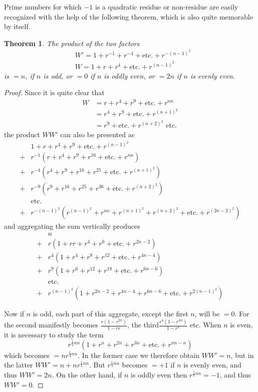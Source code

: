 \documentclass{book}
\theoremstyle{plain}
\newtheorem*{theorem}{Theorem}
\theoremstyle{remark}
\begin{document}
Prime numbers for which $-1$ is a quadratic residue or non-residue are easily recognized with the help of the following theorem, which is also quite memorable by itself.  
\begin{theorem} The product of the two factors
\begin{align*}
& W' = 1 + r^{-1} + r^{-4} + \textrm{etc.}+r^{-(n-1)^2} \\
& W = 1 + r + r^4 + \textrm{etc.} + r^{(n-1)^2} 
\end{align*}
is $=n$, if $n$ is odd, or $=0$ if $n$ is oddly even, or $=2n$ if $n$ is evenly even.
\end{theorem}
\begin{proof} Since it is quite clear that
\begin{align*}
W &= r + r^4 + r^9 + \textrm{etc.} + r^{nn} \\
&= r^4 + r^9 + \textrm{etc.} + r^{(n+1)^2} \\
&= r^9 + \textrm{etc.} + r^{(n+2)^2} \textrm{ etc.}
\end{align*}
the product $WW'$ can also be presented as
\begin{align*}
&1 + r + r^4 + r^9 + \textrm{etc.} + r^{(n-1)^2} \\
+&r^{-1}\left(r + r^4 + r^9 + r^{16} + \textrm{etc.} + r^{nn}\right) \\
+&r^{-4}\left(r^4 + r^9 + r^{16} + r^{25} + \textrm{etc.} + r^{(n+1)^2}\right) \\
+&r^{-9}\left( r^9 + r^{16} + r^{25}+r^{36}+\textrm{etc.} + r^{(n+2)^2}\right) \\
&\textrm{etc.} \\
+&r^{-(n-1)^2}\left(r^{(n-1)^2} + r^{nn}+r^{(n+1)^2}+r^{(n+2)^2} + \textrm{etc.} + r^{(2n-2)^2}\right) 
\end{align*}
and aggregating the sum vertically produces
\begin{align*}
&n \\
+&r\left(1+rr + r^4 + r^6 + \textrm{etc.} + r^{2n-2}\right) \\
+&r^4\left(1+ r^4 + r^8 + r^{12} + \textrm{etc.} + r^{4n-4}\right) \\
+&r^9\left(1 + r^6 + r^{12} + r^{18} + \textrm{etc.} + r^{6n-6}\right)\\
&\textrm{etc.}\\
+&r^{(n-1)^2}\left(1 + r^{2n-2} + r^{4n-4} + r^{6n-6} + \textrm{etc.} + r^{2(n-1)^2}\right) 
\end{align*}

Now if $n$ is odd, each part of this aggregate, except the first $n$, will be $=0$.  For the second manifestly becomes $\frac{r(1-r^{2n})}{1-rr}$, the third$ \frac{r^4(1-r^{4n})}{1-r^4}$ etc.  When $n$ is even, it is necessary to study the term
\[ r^{\frac{1}{4} nn} \left( 1 + r^n + r^{2n} + r^{3n} + \textrm{etc.}+r^{nn-n} \right)\]
which becomes $= nr^{\frac{1}{4}nn}$.  In the former case we therefore obtain $WW'=n$, but in the latter $WW'=n+nr^{\frac{1}{4}nn}$.   But $r^{\frac{1}{4}nn}$ becomes $=+1$ if $n$ is evenly even, and thus $WW'=2n$.  On the other hand, if $n$ is oddly even then $r^{\frac{1}{4}nn}= -1$, and thus $WW'=0$.
\end{proof}
\end{document}

